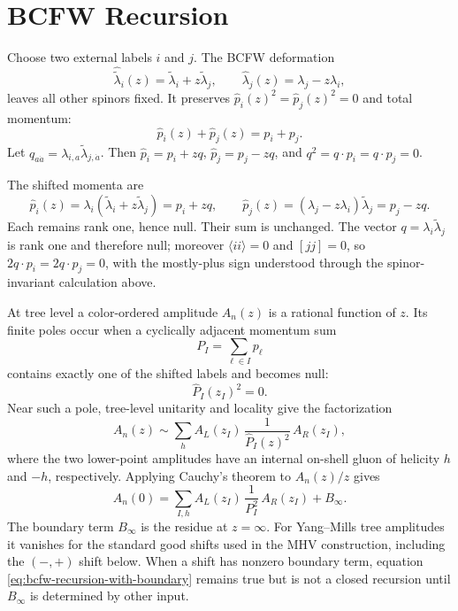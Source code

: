 \section{BCFW Recursion}
\label{sec:bcfw-recursion}

Choose two external labels \(i\) and \(j\).  The BCFW deformation
\begin{equation}
  \widehat{\widetilde\lambda}_i(z)
  =
  \widetilde\lambda_i+z\widetilde\lambda_j,
  \qquad
  \widehat\lambda_j(z)
  =
  \lambda_j-z\lambda_i,
  \label{eq:bcfw-shift}
\end{equation}
leaves all other spinors fixed.  It preserves
\(\widehat p_i(z)^2=\widehat p_j(z)^2=0\) and total momentum:
\[
  \widehat p_i(z)+\widehat p_j(z)=p_i+p_j .
\]
Let \(q_{a\dot a}=\lambda_{i,a}\widetilde\lambda_{j,\dot a}\).  Then
\(\widehat p_i=p_i+zq\), \(\widehat p_j=p_j-zq\), and
\(q^2=q\cdot p_i=q\cdot p_j=0\).

The shifted momenta are
\[
  \widehat p_i(z)=
  \lambda_i(\widetilde\lambda_i+z\widetilde\lambda_j)=p_i+zq,
  \qquad
  \widehat p_j(z)=
  (\lambda_j-z\lambda_i)\widetilde\lambda_j=p_j-zq.
\]
Each remains rank one, hence null.  Their sum is unchanged.  The vector
\(q=\lambda_i\widetilde\lambda_j\) is rank one and therefore null; moreover
\(\langle ii\rangle=0\) and \([jj]=0\), so
\(2q\cdot p_i=2q\cdot p_j=0\), with the mostly-plus sign understood through
the spinor-invariant calculation above.

At tree level a color-ordered amplitude \(A_n(z)\) is a rational function of
\(z\).  Its finite poles occur when a cyclically adjacent momentum sum
\[
  P_I=\sum_{\ell\in I}p_\ell
\]
contains exactly one of the shifted labels and becomes null:
\begin{equation}
  \widehat P_I(z_I)^2=0.
  \label{eq:bcfw-factorization-pole}
\end{equation}
Near such a pole, tree-level unitarity and locality give the factorization
\begin{equation}
  A_n(z)
  \sim
  \sum_{h}
  A_L(z_I)\,
  \frac{1}{\widehat P_I(z)^2}\,
  A_R(z_I),
  \label{eq:tree-factorization-bcfw}
\end{equation}
where the two lower-point amplitudes have an internal on-shell gluon of
helicity \(h\) and \(-h\), respectively.  Applying Cauchy's theorem to
\(A_n(z)/z\) gives
\begin{equation}
  A_n(0)
  =
  \sum_{I,h}
  A_L(z_I)\,
  \frac{1}{P_I^2}\,
  A_R(z_I)
  +B_\infty .
  \label{eq:bcfw-recursion-with-boundary}
\end{equation}
The boundary term \(B_\infty\) is the residue at \(z=\infty\).  For
Yang--Mills tree amplitudes it vanishes for the standard good shifts used in
the MHV construction, including the \((-,+)\) shift below.  When a shift has
nonzero boundary term, equation \eqref{eq:bcfw-recursion-with-boundary} remains
true but is not a closed recursion until \(B_\infty\) is determined by other
input.

